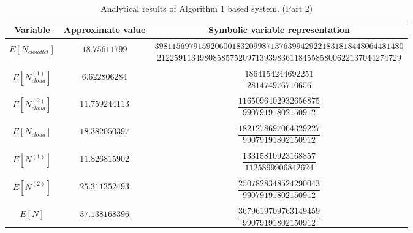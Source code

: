 \documentclass[10pt,a4paper]{article}
\begin{document}
\begin{table}[h!]
\caption{Analytical results of Algorithm 1 based system. (Part 2)}
\begin{adjustbox}{center=\textwidth}
	
     \begin{tabular}{c|c|c}
     \toprule
     \textbf{Variable} & \textbf{Approximate value} & \textbf{Symbolic variable representation} \\
     \toprule
	 &&\\
	 
	 $E[N_{cloudlet}]$ & $18.75611799$ & $\dfrac{3981156979159206001832099871376399429221831818448064481480}{212259113498085857520971393983611845585800622137044274729}$ \\
	 
	 &&\\\hline &&\\

	 $E[N^{(1)}_{cloud}]$ & $6.622806284$ & $\dfrac{1864154244692251}{281474976710656}$  \\

	 &&\\\hline &&\\
	
	 $E[N^{(2)}_{cloud}]$ & $11.759244113$ & $\dfrac{1165096402932656875}{99079191802150912}$   \\
     
     &&\\\hline &&\\
     
     $E[N_{cloud}]$ & $18.382050397$ & $\dfrac{1821278697064329227}{99079191802150912}$  \\
     
     &&\\\hline &&\\
     
     $E[N^{(1)}]$ & $11.826815902$ &  $\dfrac{13315810923168857}{1125899906842624}$   \\
     
     &&\\\hline &&\\
     
     $E[N^{(2)}]$ & $25.311352493$  &  $\dfrac{2507828348524290043}{99079191802150912}$ \\
     
     &&\\\hline &&\\
     
     $E[N]$ & $37.138168396$ & $\dfrac{3679619709763149459}{99079191802150912}$  \\
	

\end{tabular}
\end{adjustbox}
\end{table}
\end{document}
